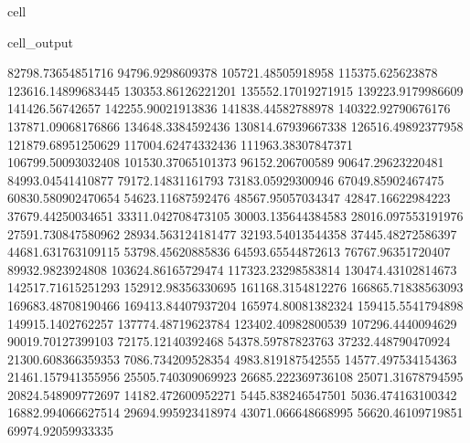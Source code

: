 \documentclass[letterpaper,10pt,english]{jupyterBook}
\begin{document}
\begin{sphinxuseclass}{cell}
\begin{sphinxVerbatimOutput}
\begin{sphinxuseclass}{cell_output}
\begin{sphinxVerbatim}[commandchars=\\\{\}]
82798.73654851716  94796.9298609378  105721.48505918958  115375.625623878  123616.14899683445  130353.86126221201  135552.17019271915  139223.9179986609  141426.56742657  142255.90021913836  141838.44582788978  140322.92790676176  137871.09068176866  134648.3384592436  130814.67939667338  126516.49892377958  121879.68951250629  117004.62474332436  111963.38307847371  106799.50093032408  101530.37065101373  96152.206700589  90647.29623220481  84993.04541410877  79172.14831161793  73183.05929300946  67049.85902467475  60830.580902470654  54623.11687592476  48567.95057034347  42847.16622984223  37679.44250034651  33311.042708473105  30003.135644384583  28016.097553191976  27591.730847580962  28934.563124181477  32193.54013544358  37445.48272586397  44681.631763109115  53798.45620885836  64593.65544872613  76767.96351720407  89932.9823924808  103624.86165729474  117323.23298583814  130474.43102814673  142517.71615251293  152912.98356330695  161168.3154812276  166865.71838563093  169683.48708190466  169413.84407937204  165974.80081382324  159415.5541794898  149915.1402762257  137774.48719623784  123402.40982800539  107296.4440094629  90019.70127399103  72175.12140392468  54378.59787823763  37232.448790470924  21300.608366359353  7086.734209528354  \PYGZhy{}4983.819187542555  \PYGZhy{}14577.497534154363  \PYGZhy{}21461.157941355956  \PYGZhy{}25505.740309069923  \PYGZhy{}26685.222369736108  \PYGZhy{}25071.31678794595  \PYGZhy{}20824.548909772697  \PYGZhy{}14182.472600952271  \PYGZhy{}5445.838246547501  5036.474163100342  16882.994066627514  29694.995923418974  43071.066648668995  56620.46109719851  69974.92059933335  

\end{sphinxVerbatim}
\end{sphinxuseclass}
\end{sphinxVerbatimOutput}
\end{sphinxuseclass}
\end{document}
